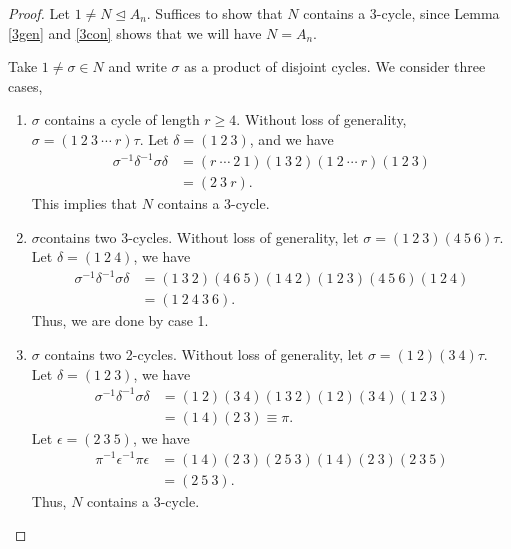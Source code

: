 \begin{proof}
    Let \(1\neq N \trianglelefteq A_n\). Suffices to show that \(N\) contains a 3-cycle, since Lemma \eqref{3gen} and \eqref{3con} shows that we will have \(N=A_n\).

    Take \(1\neq \sigma\in N\) and write \(\sigma\) as a product of disjoint cycles. We consider three cases,
    \begin{enumerate}
        \item \(\sigma\) contains a cycle of length \(r \geq 4\). Without loss of generality, \(\sigma = (1~2~3~\cdots~r)\tau\). Let \(\delta = (1~2~3)\), and we have
        \begin{align*}
            \sigma^{-1}\delta^{-1}\sigma\delta &= (r~\cdots~2~1)(1~3~2)(1~2~\cdots~r)(1~2~3)\\
            &=(2~3~r).
        \end{align*}
        This implies that \(N\) contains a 3-cycle.
        \item \(\sigma\)contains two 3-cycles. Without loss of generality, let \(\sigma=(1~2~3)(4~5~6)\tau\). Let \(\delta = (1~2~4)\), we have
        \begin{align*}
            \sigma^{-1}\delta^{-1}\sigma\delta&=(1~3~2)(4~6~5)(1~4~2)(1~2~3)(4~5~6)(1~2~4)\\
            &=(1~2~4~3~6).
        \end{align*}
        Thus, we are done by case 1.
        \item \(\sigma\) contains two 2-cycles. Without loss of generality, let \(\sigma = (1~2)(3~4)\tau\). Let \(\delta = (1~2~3)\), we have
        \begin{align*}
            \sigma^{-1}\delta^{-1}\sigma\delta&=(1~2)(3~4)(1~3~2)(1~2)(3~4)(1~2~3)\\
            &=(1~4)(2~3)\equiv \pi.
        \end{align*}
        Let \(\epsilon = (2~3~5)\), we have
        \begin{align*}
            \pi^{-1}\epsilon^{-1}\pi\epsilon&=(1~4)(2~3)(2~5~3)(1~4)(2~3)(2~3~5)\\
            &=(2~5~3).
        \end{align*}
        Thus, \(N\) contains a 3-cycle.
    \end{enumerate}
\end{proof}